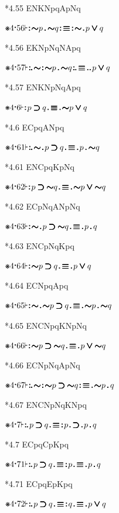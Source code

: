 \documentclass[12pt]{article}
\newcommand{\pmthm}{\mathpunct{\text{\scalebox{.5}[1]{$\boldsymbol\vdash$}}}} %
\newcommand{\pmast}{\text{\resizebox{!}{.75\height}{\ding{107}}}} %
\newcommand{\pmcdot}{\text{\raisebox{.05cm}{$\boldsymbol\cdot$}}} %
\newcommand{\pmd}{\hbox{\rule{.3ex}{.3ex}}} %
\newcommand{\pmdd}{\overset{\pmd}{\pmd}} %
\newcommand{\pmdot}{\mathinner{\pmd}}
\newcommand{\pmdott}{\mathinner{\pmdd}}
\newcommand{\pmdottt}{\mathinner{\pmdd\hspace{1pt}\pmd}}
\newcommand{\pmnot}{\mathord{\ooalign{$\boldsymbol{\sim}\mkern.5mu$\hidewidth\cr$\boldsymbol{\sim}$\cr\hidewidth$\mkern.5mu\boldsymbol{\sim}$}}}
\newcommand{\pmor}{\mathbin{\ooalign{$\boldsymbol{\vee}\mkern.5mu$\hidewidth\cr$\boldsymbol{\vee}$\cr\hidewidth$\mkern.5mu\boldsymbol{\vee}$}}}
\newcommand{\pmimp}{\mathbin{\ooalign{$\boldsymbol{\supset}\mkern.5mu$\hidewidth\cr$\boldsymbol{\supset}$\cr\hidewidth$\mkern.5mu\boldsymbol{\supset}$}}} %
\newcommand{\pmand}{\mathbin{\pmd}}%
\newcommand{\pmiff}{\mathbin{\ooalign{$\boldsymbol{\equiv}\mkern.5mu$\hidewidth\cr$\boldsymbol{\equiv}$\cr\hidewidth$\mkern.5mu\boldsymbol{\equiv}$}}} %
\begin{document}
*4.55 ENKNpqApNq

$\pmast 4 \pmcdot 56 \pmthm \pmdott \pmnot p \pmand \pmnot q \pmdott \pmiff \pmdott \pmnot \pmdot p \pmor q   $

*4.56 EKNpNqNApq

$\pmast 4 \pmcdot 57 \pmthm \pmdottt \pmnot \pmdott \pmnot p \pmand \pmnot q \pmdottt \pmiff \pmdot \pmdot p \pmor q   $

*4.57 ENKNpNqApq

$\pmast 4 \pmcdot 6 \pmthm \pmdott p \pmimp q \pmdot \pmiff \pmdot \pmnot p \pmor q   $

*4.6 ECpqANpq

$\pmast 4 \pmcdot 61 \pmthm \pmdottt \pmnot \pmdot p \pmimp q \pmdot \pmiff \pmdot p \pmand \pmnot q   $

*4.61 ENCpqKpNq

$\pmast 4 \pmcdot 62 \pmthm \pmdott  p \pmimp \pmnot q \pmdot \pmiff \pmdot \pmnot p \pmor \pmnot q   $

*4.62 ECpNqANpNq

$\pmast 4 \pmcdot 63 \pmthm \pmdott  \pmnot \pmdot p \pmimp \pmnot q \pmdot \pmiff \pmdot p \pmand q   $

*4.63 ENCpNqKpq

$\pmast 4 \pmcdot 64 \pmthm \pmdott  \pmnot p \pmimp q \pmdot \pmiff \pmdot p \pmor q   $

*4.64 ECNpqApq

$\pmast 4 \pmcdot 65 \pmthm \pmdott  \pmnot \pmdot \pmnot p \pmimp q \pmdot \pmiff \pmdot \pmnot p \pmand \pmnot q   $

*4.65 ENCNpqKNpNq

$\pmast 4 \pmcdot 66 \pmthm \pmdott  \pmnot p \pmimp \pmnot q \pmdot \pmiff \pmdot p \pmor \pmnot q   $

*4.66 ECNpNqApNq

$\pmast 4 \pmcdot 67 \pmthm \pmdottt  \pmnot \pmdott \pmnot p \pmimp \pmnot q \pmdott \pmiff \pmdot \pmnot p \pmand q   $

*4.67 ENCNpNqKNpq

$\pmast 4 \pmcdot 7 \pmthm \pmdottt p \pmimp q \pmdot \pmiff \pmdott p \pmdot \pmimp \pmdot p \pmand q   $

*4.7 ECpqCpKpq

$\pmast 4 \pmcdot 71 \pmthm \pmdottt p \pmimp q \pmdot \pmiff \pmdott p \pmdot \pmiff \pmdot p \pmand q   $

*4.71 ECpqEpKpq

$\pmast 4 \pmcdot 72 \pmthm \pmdottt p \pmimp q \pmdot \pmiff \pmdott q \pmdot \pmiff \pmdot p \pmor q   $
\end{document}
